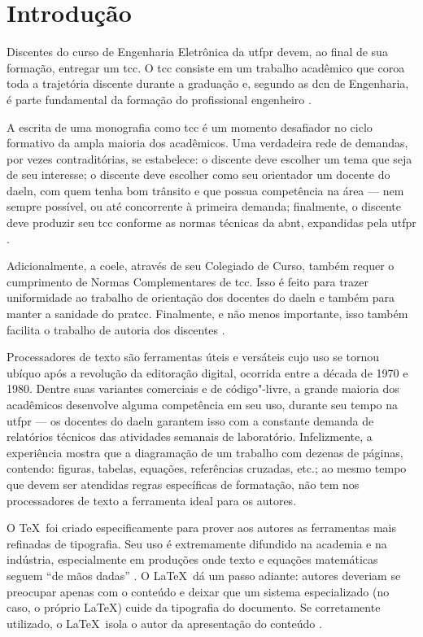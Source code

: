 \chapter{Introdução}

Discentes do curso de Engenharia Eletrônica da \ac{utfpr} devem, ao final de sua formação, entregar um \ac{tcc}. O \ac{tcc} consiste em um trabalho acadêmico que coroa toda a trajetória discente durante a graduação e, segundo as \ac{dcn} de Engenharia, é parte fundamental da formação do profissional engenheiro \cite{mec2021}.

A escrita de uma monografia como \ac{tcc} é um momento desafiador no ciclo formativo da ampla maioria dos acadêmicos. Uma verdadeira rede de demandas, por vezes contraditórias, se estabelece: o discente deve escolher um tema que seja de seu interesse; o discente deve escolher como seu orientador um docente do \ac{daeln}, com quem tenha bom trânsito e que possua competência na área --- nem sempre possível, ou até concorrente à primeira demanda; finalmente, o discente deve produzir seu \ac{tcc} conforme as normas técnicas da \ac{abnt}, expandidas pela \ac{utfpr} \cites{cogep2021,prograd2021}.

Adicionalmente, a \ac{coele}, através de seu Colegiado de Curso, também requer o cumprimento de Normas Complementares de \ac{tcc}. Isso é feito para trazer uniformidade ao trabalho de orientação dos docentes do \ac{daeln} e também para manter a sanidade do \ac{pratcc}. Finalmente, e não menos importante, isso também facilita o trabalho de autoria dos discentes \cite{coele2023}.

Processadores de texto são ferramentas úteis e versáteis cujo uso se tornou ubíquo após a revolução da editoração digital, ocorrida entre a década de 1970 e 1980. Dentre suas variantes comerciais e de código"-livre, a grande maioria dos acadêmicos desenvolve alguma competência em seu uso, durante seu tempo na \ac{utfpr} --- os docentes do \ac{daeln} garantem isso com a constante demanda de relatórios técnicos das atividades semanais de laboratório. Infelizmente, a experiência mostra que a diagramação de um trabalho com dezenas de páginas, contendo: figuras, tabelas, equações, referências cruzadas, etc.; ao mesmo tempo que devem ser atendidas regras específicas de formatação, não tem nos processadores de texto a ferramenta ideal para os autores.

O \TeX\ foi criado especificamente para prover aos autores as ferramentas mais refinadas de tipografia. Seu uso é extremamente difundido na academia e na indústria, especialmente em produções onde texto e equações matemáticas seguem \enquote{de mãos dadas} \cite{Knuth1986a}. O \LaTeX\ dá um passo adiante: autores deveriam se preocupar apenas com o conteúdo e deixar que um sistema especializado (no caso, o próprio \LaTeX) cuide da tipografia do documento. Se corretamente utilizado, o \LaTeX\ isola o autor da apresentação do conteúdo \cite{Lamport1994}.

